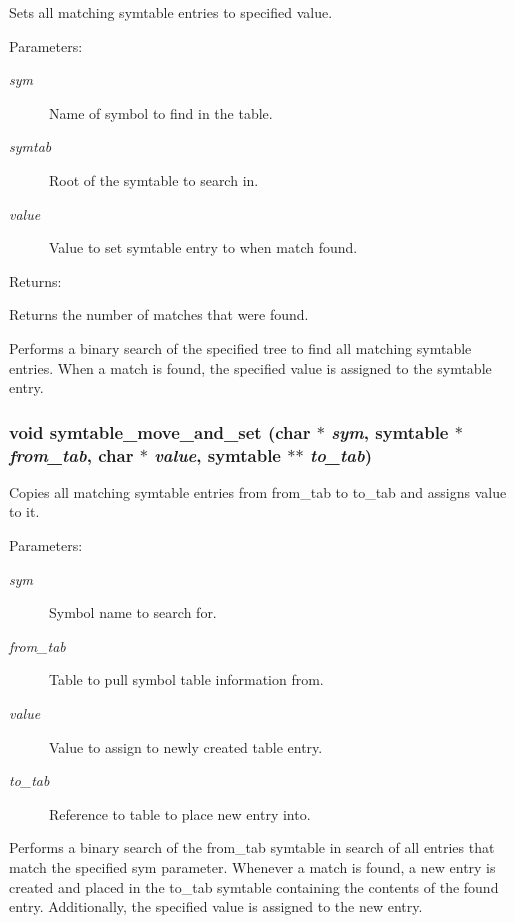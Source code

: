 Sets all matching symtable entries to specified value.

\begin{Desc}
\item[Parameters: ]\par
\begin{description}
\item[{\em 
sym}]Name of symbol to find in the table. \item[{\em 
symtab}]Root of the symtable to search in. \item[{\em 
value}]Value to set symtable entry to when match found.\end{description}
\end{Desc}
\begin{Desc}
\item[Returns: ]\par
Returns the number of matches that were found.\end{Desc}
Performs a binary search of the specified tree to find all matching symtable entries. When a match is found, the specified value is assigned to the symtable entry. 
\subsubsection{\setlength{\rightskip}{0pt plus 5cm}void symtable\_\-move\_\-and\_\-set (char $\ast$ {\em sym}, {\bf symtable} $\ast$ {\em from\_\-tab}, char $\ast$ {\em value}, {\bf symtable} $\ast$$\ast$ {\em to\_\-tab})}\label{symtable_8h_a2}


Copies all matching symtable entries from from\_\-tab to to\_\-tab and assigns value to it.

\begin{Desc}
\item[Parameters: ]\par
\begin{description}
\item[{\em 
sym}]Symbol name to search for. \item[{\em 
from\_\-tab}]Table to pull symbol table information from. \item[{\em 
value}]Value to assign to newly created table entry. \item[{\em 
to\_\-tab}]Reference to table to place new entry into.\end{description}
\end{Desc}
Performs a binary search of the from\_\-tab symtable in search of all entries that match the specified sym parameter. Whenever a match is found, a new entry is created and placed in the to\_\-tab symtable containing the contents of the found entry. Additionally, the specified value is assigned to the new entry. 
